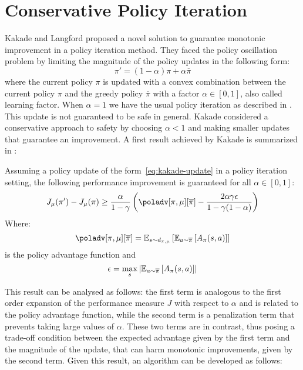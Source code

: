 \section{Conservative Policy Iteration}
\label{sec:cpi}
Kakade and Langford \cite{Kakade02approximatelyoptimal} proposed a novel solution to guarantee monotonic improvement in a policy iteration method. They faced the policy oscillation problem by limiting the magnitude of the policy updates in the following form:
\begin{equation}
\pi' = (1-\alpha )\pi + \alpha\overline{\pi} \label{eq:kakade-update}
\end{equation}
where the current policy $\pi$ is updated with a convex combination between the current policy $\pi$ and the greedy policy $\overline{\pi}$ with a factor $\alpha \in [0,1]$, also called learning factor.
When $\alpha = 1$ we have the usual policy iteration as described in . This update is not guaranteed to be safe in general. Kakade considered a conservative approach to safety by choosing $\alpha < 1$ and making smaller updates that guarantee an improvement.
A first result achieved by Kakade is summarized in :
\begin{theorem}
\label{th:kakade1}
Assuming a policy update of the form~\ref{eq:kakade-update} in a policy iteration setting, the following performance improvement is guaranteed for all $\alpha \in [0,1]$:
\begin{equation}
J_{\mu}(\pi') - J_{\mu}(\pi) \geq \frac{\alpha}{1 - \gamma}\left( \poladv[\pi, \mu][\overline{\pi}] - \frac{2\alpha \gamma \epsilon}{1 - \gamma (1 - \alpha)} \right) \label{eq:kakade-improvement}
\end{equation}
Where:
\begin{equation}
\poladv[\pi, \mu][\overline{\pi}] = \EV[s\sim d_{\pi, \mu}]{ \EV[a\sim\overline{\pi}]{A_{\pi}(s,a)}}
\end{equation}
is the policy advantage function and
\begin{equation}
\epsilon = \max_s \left| \EV[a\sim\overline{\pi}]{A_{\pi}(s,a)} \right|
\end{equation}
\end{theorem}

This result can be analysed as follows: the first term is analogous to the first order expansion of the performance measure $J$ with respect to $\alpha$ and is related to the policy advantage function, while the second term is a penalization term that prevents taking large values of $\alpha$. These two terms are in contrast, thus posing a trade-off condition between the expected advantage given by the first term and the magnitude of the update, that can harm monotonic improvements, given by the second term. Given this result, an algorithm can be developed as follows:

